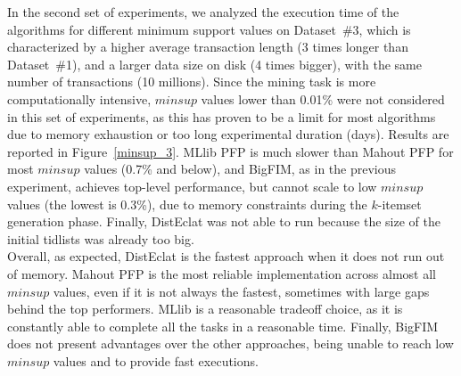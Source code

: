 In the second set of experiments, we analyzed the execution time of
the algorithms for different minimum support values on Dataset~\#3,
which is characterized by a higher average transaction length
(3 times longer than Dataset~\#1),
and a larger data size on disk (4 times bigger),
with the same number of transactions (10 millions).
Since the mining task is more computationally intensive,
$minsup$ values lower than 0.01\% were
not considered in this set of experiments,
as this has proven to be a limit for most algorithms
due to memory exhaustion or too long experimental duration (days).
Results are reported in Figure~\ref{minsup_3}.
MLlib PFP is much slower than Mahout PFP for most $minsup$ values (0.7\% and below),
and BigFIM, as in the previous experiment,
achieves top-level performance, but cannot scale to low $minsup$ values
(the lowest is 0.3\%),
due to memory constraints during the $k$-itemset generation phase. Finally, DistEclat was not able to run because the size of the initial tidlists was already too big.\\
Overall, as expected,
DistEclat is the fastest approach when it does not run out of memory.
Mahout PFP is the most reliable implementation across almost all $minsup$ values,
even if it is not always the fastest,
sometimes with large gaps behind the top performers.
MLlib is a reasonable tradeoff choice,
as it is constantly able to complete all the tasks in a reasonable time.
Finally, BigFIM does not present advantages over the other approaches,
being unable to reach low $minsup$ values and to provide fast executions. \\
